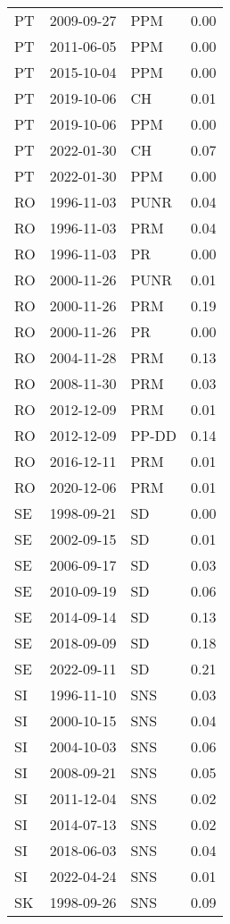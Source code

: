 \begin{longtable}{lllr}
  PT & 2009-09-27 & PPM & 0.00 \\ 
  PT & 2011-06-05 & PPM & 0.00 \\ 
  PT & 2015-10-04 & PPM & 0.00 \\ 
  PT & 2019-10-06 & CH & 0.01 \\ 
  PT & 2019-10-06 & PPM & 0.00 \\ 
  PT & 2022-01-30 & CH & 0.07 \\ 
  PT & 2022-01-30 & PPM & 0.00 \\ 
  RO & 1996-11-03 & PUNR & 0.04 \\ 
  RO & 1996-11-03 & PRM & 0.04 \\ 
  RO & 1996-11-03 & PR & 0.00 \\ 
  RO & 2000-11-26 & PUNR & 0.01 \\ 
  RO & 2000-11-26 & PRM & 0.19 \\ 
  RO & 2000-11-26 & PR & 0.00 \\ 
  RO & 2004-11-28 & PRM & 0.13 \\ 
  RO & 2008-11-30 & PRM & 0.03 \\ 
  RO & 2012-12-09 & PRM & 0.01 \\ 
  RO & 2012-12-09 & PP-DD & 0.14 \\ 
  RO & 2016-12-11 & PRM & 0.01 \\ 
  RO & 2020-12-06 & PRM & 0.01 \\ 
  SE & 1998-09-21 & SD & 0.00 \\ 
  SE & 2002-09-15 & SD & 0.01 \\ 
  SE & 2006-09-17 & SD & 0.03 \\ 
  SE & 2010-09-19 & SD & 0.06 \\ 
  SE & 2014-09-14 & SD & 0.13 \\ 
  SE & 2018-09-09 & SD & 0.18 \\ 
  SE & 2022-09-11 & SD & 0.21 \\ 
  SI & 1996-11-10 & SNS & 0.03 \\ 
  SI & 2000-10-15 & SNS & 0.04 \\ 
  SI & 2004-10-03 & SNS & 0.06 \\ 
  SI & 2008-09-21 & SNS & 0.05 \\ 
  SI & 2011-12-04 & SNS & 0.02 \\ 
  SI & 2014-07-13 & SNS & 0.02 \\ 
  SI & 2018-06-03 & SNS & 0.04 \\ 
  SI & 2022-04-24 & SNS & 0.01 \\ 
  SK & 1998-09-26 & SNS & 0.09 \\ 

\end{longtable}
